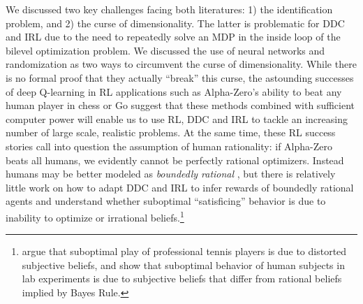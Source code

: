 We discussed two key challenges facing both literatures: 1) the identification problem, and 2) the curse of dimensionality.
The latter is problematic for DDC and IRL due to the need to repeatedly solve an MDP in the inside loop of the bilevel optimization problem. We discussed
the use of neural networks and randomization as two  ways to  circumvent the curse of dimensionality. While
there is no formal proof that they actually ``break'' this curse, the
astounding successes of deep Q-learning in RL applications such as Alpha-Zero's ability to beat any human player in chess or Go suggest  that these
methods combined with sufficient computer power will enable us to use RL, DDC and IRL to tackle an increasing number of large scale, realistic problems.
At the same time, these RL success stories call into question the assumption of human rationality: if Alpha-Zero beats all humans,
we evidently cannot be perfectly rational optimizers. Instead humans may be better modeled as {\it boundedly rational\/} \citep{Simon:1957}, but
there is relatively little work on how to adapt DDC and IRL to infer rewards of boundedly rational agents and understand whether suboptimal ``satisficing'' behavior
is due to inability to optimize or irrational beliefs.\footnote{\footnotesize \citet{tennis:2025} argue that
suboptimal play of professional tennis players is due to distorted subjective beliefs, and \citet{whoismorebayesian:2025} show that suboptimal behavior of
human subjects in lab experiments is due to subjective beliefs that differ from rational beliefs implied by Bayes Rule.}

